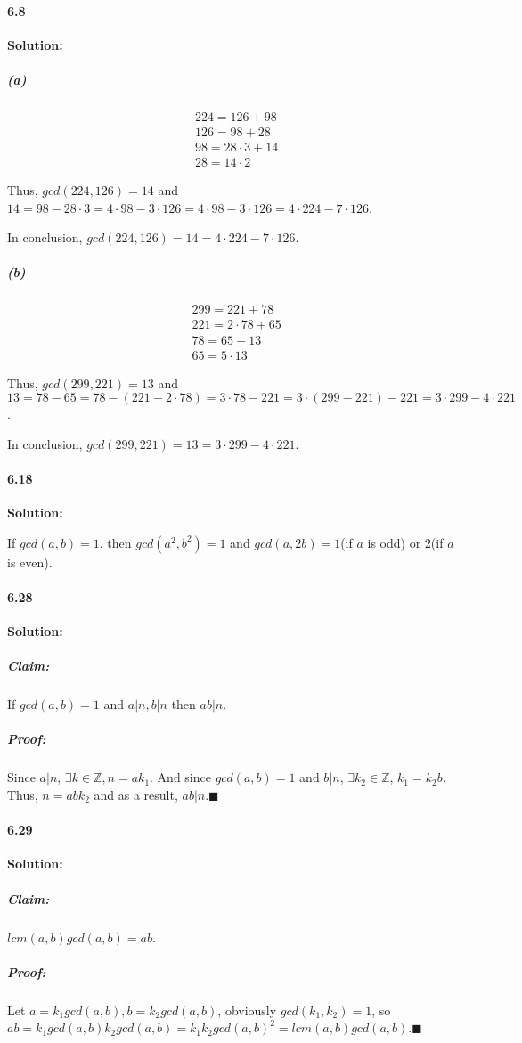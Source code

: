 \documentclass[11pt]{article}
\begin{document}
	\paragraph{6.8}\textbf{Solution:}
		\subparagraph{(a)}
			\begin{align}
				&224 = 126 + 98\nonumber\\
				&126 = 98 + 28\nonumber\\
				&98 = 28 \cdot 3 + 14\nonumber\\
				&28 = 14 \cdot 2\nonumber
			\end{align}
			
			Thus, $gcd(224, 126) = 14$ and $14 = 98 - 28 \cdot 3 = 4\cdot 98 - 3 \cdot 126 = 4\cdot 98 - 3 \cdot 126 = 4 \cdot 224 - 7 \cdot 126$.
			
			In conclusion, $gcd(224, 126) = 14 = 4 \cdot 224 - 7 \cdot 126$.
			
		\subparagraph{(b)}
			\begin{align}
				&299 = 221 + 78\nonumber\\
				&221 = 2\cdot 78 + 65\nonumber\\
				&78 = 65 + 13\nonumber\\
				&65 = 5\cdot 13\nonumber
			\end{align}
			
			Thus, $gcd(299, 221) = 13$ and $13 = 78 - 65 = 78 - (221 - 2\cdot 78) = 3 \cdot 78 - 221 = 3 \cdot (299 - 221) - 221 = 3 \cdot 299 - 4 \cdot 221$.
			
			In conclusion, $gcd(299, 221) = 13 = 3 \cdot 299 - 4 \cdot 221$.
	\paragraph{6.18}\textbf{Solution:}
	
		If $gcd(a, b) = 1$, then $gcd(a^2, b^2) = 1$ and $gcd(a, 2b) = 1$(if $a$ is odd) or $2$(if $a$ is even).
	\paragraph{6.28}\textbf{Solution:}
		\subparagraph{Claim:} If $gcd(a, b) = 1$ and $a|n, b|n$ then $ab | n$.
		\subparagraph{Proof:} Since $a|n$, $\exists k\in \mathbb{Z}, n = ak_1$. And since $gcd(a, b) = 1$ and $b|n$, $\exists k_2 \in \mathbb{Z}$, $k_1 = k_2b$. Thus, $n = abk_2$ and as a result, $ab | n$.$\blacksquare$
	\paragraph{6.29}\textbf{Solution:}
		\subparagraph{Claim:}$lcm(a, b)gcd(a, b) = ab$.
		\subparagraph{Proof:} Let $a = k_1gcd(a, b), b = k_2gcd(a, b)$, obviously $gcd(k_1, k_2) = 1$, so $ab = k_1gcd(a, b)k_2gcd(a, b) = k_1k_2gcd(a, b)^2 = lcm(a, b)gcd(a, b)$.$\blacksquare$
			
\end{document}
